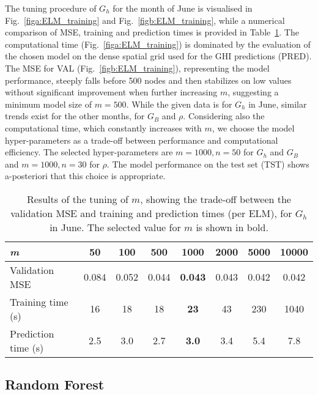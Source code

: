 The tuning procedure of $G_h$ for the month of June is visualised in Fig.~\ref{figa:ELM_training} and Fig.~\ref{figb:ELM_training}, while a numerical comparison of MSE, training and prediction times is provided in Table~\ref{tab:ELM_tuning}. The computational time (Fig.~\ref{figa:ELM_training}) is dominated by the evaluation of the chosen model on the dense spatial grid used for the GHI predictions (PRED). The MSE for VAL (Fig.~\ref{figb:ELM_training}), representing the model performance, steeply falls before 500 nodes and then stabilizes on low values without significant improvement when further increasing $m$, suggesting a minimum model size of $m = 500$. While the given data is for $G_h$ in June, similar trends exist for the other months, for $G_B$ and $\rho$. 
Considering also the computational time, which constantly increases with $m$, we choose the model hyper-parameters as a trade-off between performance and computational efficiency. 
The selected hyper-parameters are $m=1000, n=50$ for $G_h$ and $G_B$ and $m=1000, n=30$ for $\rho$.
The model performance on the test set (TST) shows a-posteriori that this choice is appropriate.

\begin{table}[tb]
\centering
\footnotesize
\caption{Results of the tuning of $m$, showing the trade-off between the validation MSE and training and prediction times (per ELM), for $G_h$ in June. The selected value for $m$ is shown in bold.}
\label{tab:ELM_tuning}

    \begin{tabular}{lccccccc}
    \hline
    \textit{m}          & 50    & 100   & 500   & \textbf{1000}  & 2000  & 5000  & 10000 \\ \hline
    Validation MSE      & 0.084 & 0.052 & 0.044 & \textbf{0.043} & 0.043 & 0.042 & 0.042 \\
    Training time (s)   & 16    & 18    & 18    & \textbf{23}    & 43    & 230   & 1040  \\
    Prediction time (s) & 2.5   & 3.0   & 2.7   & \textbf{3.0}   & 3.4   & 5.4   & 7.8   \\ \hline
    \end{tabular}
\end{table}

\subsection*{Random Forest}
\label{app:tune_RF}

